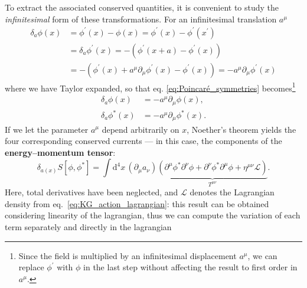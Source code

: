 To extract the associated conserved quantities, it is convenient to study the \textit{infinitesimal} form of these transformations.
For an infinitesimal translation \(a^{\mu}\)
\[
    \begin{aligned}
        \delta_a \phi(x) & = \phi^{\prime} (x) - \phi(x) = \phi^{\prime} (x) - \phi^{\prime} (x^{\prime})                                                        \\
                         & = \delta_a \phi^{\prime} (x) = - \left(\phi^{\prime} (x+a) - \phi^{\prime} (x)\right)                                                 \\
                         & = - \left(\phi^{\prime} (x) + a^{\mu}\partial_\mu \phi^{\prime}(x) - \phi^{\prime} (x)\right) = -a^{\mu}\partial_\mu \phi^{\prime}(x)
    \end{aligned}
\]
where we have Taylor expanded, so that eq. \eqref{eq:Poincaré_symmetries} becomes\footnote{Since the field is multiplied by an infinitesimal displacement \(a^{\mu}\), we can replace \(\phi^{\prime}\) with \(\phi\) in the last step without affecting the result to first order in \(a^{\mu}\).}
\begin{equation}
    \begin{aligned}
        \delta_a \phi(x)        & = -a^{\mu} \partial_{\mu} \phi(x),        \\
        \delta_a \phi^{\ast}(x) & = -a^{\mu} \partial_{\mu} \phi^{\ast}(x).
    \end{aligned}
    \label{eq:Poincaré_infinitesimal_transformations}
\end{equation}
If we let the parameter \(a^{\mu}\) depend arbitrarily on \(x\), Noether’s theorem yields the four corresponding conserved currents — in this case, the components of the \textbf{energy–momentum tensor}:
\[
    \delta_{a(x)} S[\phi, \phi^{\ast}]
    = \int \mathrm{d}^4 x \, (\partial_{\mu} a_{\nu})
    \underbrace{
        \left(
        \partial^{\mu}\phi^{\ast}\partial^{\nu}\phi
        + \partial^{\nu}\phi^{\ast}\partial^{\mu}\phi
        + \eta^{\mu\nu}\mathcal{L}
        \right)
    }_{T^{\mu\nu}}.
\]
Here, total derivatives have been neglected, and \(\mathcal{L}\) denotes the Lagrangian density from eq.~\eqref{eq:KG_action_lagrangian}: this result can be obtained considering linearity of the lagrangian, thus we can compute the variation of each term separately and directly in the lagrangian
